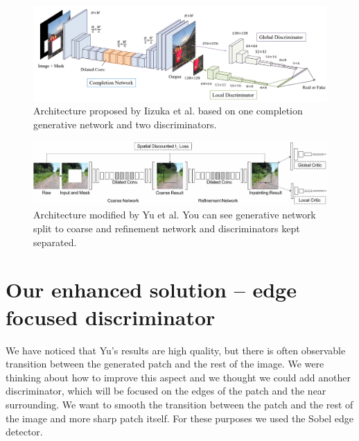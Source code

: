 \documentclass[a4paper, 11pt]{article}
\begin{document}
\begin{figure}
    \centering
    \includegraphics[width=0.95\linewidth]{documentation/img/iizukaArch.png}
    \caption{Architecture proposed by Iizuka et al. based on one completion generative network and two discriminators.}
    \label{img:iizukaArch}
\end{figure}


\begin{figure}
    \centering
    \includegraphics[width=0.95\linewidth]{documentation/img/original_arch.png}
    \caption{Architecture modified by Yu et al. You can see generative network split to coarse and refinement network and discriminators kept separated.}
    \label{img:yuArch}
\end{figure}


\section{Our enhanced solution -- edge focused discriminator}
\label{section:edgeDiscriminator}
We have noticed that Yu's \cite{Yu} results are high quality, but there is often observable transition between the generated patch and the rest of the image. We were thinking about how to improve this aspect and we thought we could add another discriminator, which will be focused on the edges of the patch and the near surrounding. We want to smooth the transition between the patch and the rest of the image and more sharp patch itself. For these purposes we used the Sobel edge detector.
\end{document}
